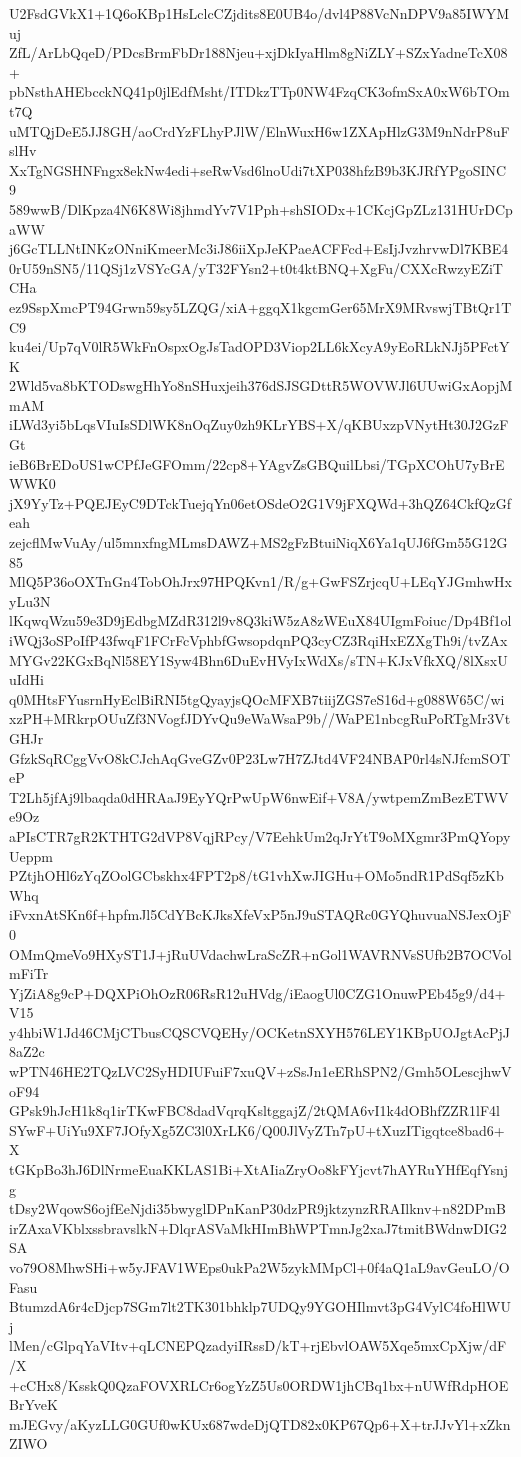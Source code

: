 U2FsdGVkX1+1Q6oKBp1HsLclcCZjdits8E0UB4o/dvl4P88VcNnDPV9a85IWYMuj
ZfL/ArLbQqeD/PDcsBrmFbDr188Njeu+xjDkIyaHlm8gNiZLY+SZxYadneTcX08+
pbNsthAHEbcckNQ41p0jlEdfMsht/ITDkzTTp0NW4FzqCK3ofmSxA0xW6bTOmt7Q
uMTQjDeE5JJ8GH/aoCrdYzFLhyPJlW/ElnWuxH6w1ZXApHlzG3M9nNdrP8uFslHv
XxTgNGSHNFngx8ekNw4edi+seRwVsd6lnoUdi7tXP038hfzB9b3KJRfYPgoSINC9
589wwB/DlKpza4N6K8Wi8jhmdYv7V1Pph+shSIODx+1CKcjGpZLz131HUrDCpaWW
j6GcTLLNtINKzONniKmeerMc3iJ86iiXpJeKPaeACFFcd+EsIjJvzhrvwDl7KBE4
0rU59nSN5/11QSj1zVSYcGA/yT32FYsn2+t0t4ktBNQ+XgFu/CXXcRwzyEZiTCHa
ez9SspXmcPT94Grwn59sy5LZQG/xiA+ggqX1kgcmGer65MrX9MRvswjTBtQr1TC9
ku4ei/Up7qV0lR5WkFnOspxOgJsTadOPD3Viop2LL6kXcyA9yEoRLkNJj5PFctYK
2Wld5va8bKTODswgHhYo8nSHuxjeih376dSJSGDttR5WOVWJl6UUwiGxAopjMmAM
iLWd3yi5bLqsVIuIsSDlWK8nOqZuy0zh9KLrYBS+X/qKBUxzpVNytHt30J2GzFGt
ieB6BrEDoUS1wCPfJeGFOmm/22cp8+YAgvZsGBQuilLbsi/TGpXCOhU7yBrEWWK0
jX9YyTz+PQEJEyC9DTckTuejqYn06etOSdeO2G1V9jFXQWd+3hQZ64CkfQzGfeah
zejcflMwVuAy/ul5mnxfngMLmsDAWZ+MS2gFzBtuiNiqX6Ya1qUJ6fGm55G12G85
MlQ5P36oOXTnGn4TobOhJrx97HPQKvn1/R/g+GwFSZrjcqU+LEqYJGmhwHxyLu3N
lKqwqWzu59e3D9jEdbgMZdR312l9v8Q3kiW5zA8zWEuX84UIgmFoiuc/Dp4Bf1ol
iWQj3oSPoIfP43fwqF1FCrFcVphbfGwsopdqnPQ3cyCZ3RqiHxEZXgTh9i/tvZAx
MYGv22KGxBqNl58EY1Syw4Bhn6DuEvHVyIxWdXs/sTN+KJxVfkXQ/8lXsxUuIdHi
q0MHtsFYusrnHyEclBiRNI5tgQyayjsQOcMFXB7tiijZGS7eS16d+g088W65C/wi
xzPH+MRkrpOUuZf3NVogfJDYvQu9eWaWsaP9b//WaPE1nbcgRuPoRTgMr3VtGHJr
GfzkSqRCggVvO8kCJchAqGveGZv0P23Lw7H7ZJtd4VF24NBAP0rl4sNJfcmSOTeP
T2Lh5jfAj9lbaqda0dHRAaJ9EyYQrPwUpW6nwEif+V8A/ywtpemZmBezETWVe9Oz
aPIsCTR7gR2KTHTG2dVP8VqjRPcy/V7EehkUm2qJrYtT9oMXgmr3PmQYopyUeppm
PZtjhOHl6zYqZOolGCbskhx4FPT2p8/tG1vhXwJIGHu+OMo5ndR1PdSqf5zKbWhq
iFvxnAtSKn6f+hpfmJl5CdYBcKJksXfeVxP5nJ9uSTAQRc0GYQhuvuaNSJexOjF0
OMmQmeVo9HXyST1J+jRuUVdachwLraScZR+nGol1WAVRNVsSUfb2B7OCVolmFiTr
YjZiA8g9cP+DQXPiOhOzR06RsR12uHVdg/iEaogUl0CZG1OnuwPEb45g9/d4+V15
y4hbiW1Jd46CMjCTbusCQSCVQEHy/OCKetnSXYH576LEY1KBpUOJgtAcPjJ8aZ2c
wPTN46HE2TQzLVC2SyHDIUFuiF7xuQV+zSsJn1eERhSPN2/Gmh5OLescjhwVoF94
GPsk9hJcH1k8q1irTKwFBC8dadVqrqKsltggajZ/2tQMA6vI1k4dOBhfZZR1lF4l
SYwF+UiYu9XF7JOfyXg5ZC3l0XrLK6/Q00JlVyZTn7pU+tXuzITigqtce8bad6+X
tGKpBo3hJ6DlNrmeEuaKKLAS1Bi+XtAIiaZryOo8kFYjcvt7hAYRuYHfEqfYsnjg
tDsy2WqowS6ojfEeNjdi35bwyglDPnKanP30dzPR9jktzynzRRAIlknv+n82DPmB
irZAxaVKblxssbravslkN+DlqrASVaMkHImBhWPTmnJg2xaJ7tmitBWdnwDIG2SA
vo79O8MhwSHi+w5yJFAV1WEps0ukPa2W5zykMMpCl+0f4aQ1aL9avGeuLO/OFasu
BtumzdA6r4cDjcp7SGm7lt2TK301bhklp7UDQy9YGOHIlmvt3pG4VylC4foHlWUj
lMen/cGlpqYaVItv+qLCNEPQzadyiIRssD/kT+rjEbvlOAW5Xqe5mxCpXjw/dF/X
+cCHx8/KsskQ0QzaFOVXRLCr6ogYzZ5Us0ORDW1jhCBq1bx+nUWfRdpHOEBrYveK
mJEGvy/aKyzLLG0GUf0wKUx687wdeDjQTD82x0KP67Qp6+X+trJJvYl+xZknZIWO
